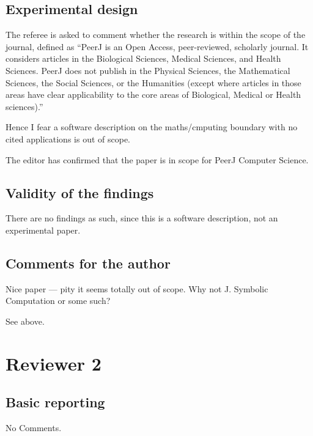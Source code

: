 \documentclass[answers,12pt]{exam}
\begin{document}
\subsection{Experimental design}
\begin{questions}
\question The referee is asked to comment whether the research is within the scope of the
journal, defined as ``PeerJ is an Open Access, peer-reviewed, scholarly
journal. It considers articles in the Biological Sciences, Medical Sciences,
and Health Sciences. PeerJ does not publish in the Physical Sciences, the
Mathematical Sciences, the Social Sciences, or the Humanities (except where
articles in those areas have clear applicability to the core areas of
Biological, Medical or Health sciences).''

Hence I fear a software description on the maths/cmputing boundary with no
cited applications is out of scope.

\begin{solution}
  The editor has confirmed that the paper is in scope for PeerJ Computer Science.
\end{solution}
\end{questions}

\subsection{Validity of the findings}
\begin{questions}
\question There are no findings as such, since this is a software description, not an
experimental paper.
\end{questions}

\subsection{Comments for the author}
\begin{questions}
\question Nice paper --- pity it seems totally out of scope. Why not J. Symbolic
Computation or some such?
\begin{solution}
  See above.
\end{solution}
\end{questions}

\section{Reviewer 2}

\subsection{Basic reporting}
No Comments.
\end{document}
